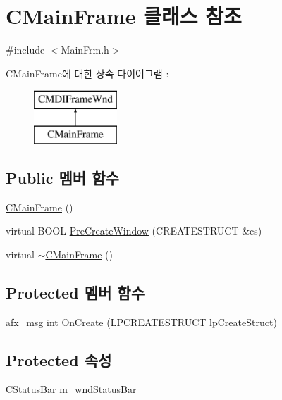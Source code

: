 \hypertarget{class_c_main_frame}{\section{C\-Main\-Frame 클래스 참조}
\label{class_c_main_frame}
}


{\ttfamily \#include $<$Main\-Frm.\-h$>$}

C\-Main\-Frame에 대한 상속 다이어그램 \-: \begin{figure}[H]
\begin{center}
\leavevmode
\includegraphics[height=2.000000cm]{class_c_main_frame}
\end{center}
\end{figure}
\subsection*{Public 멤버 함수}
\begin{DoxyCompactItemize}
\item 
\hyperlink{class_c_main_frame_af3e997aeae4148d2aaa4a1e1ae7bdd53}{C\-Main\-Frame} ()
\item 
virtual B\-O\-O\-L \hyperlink{class_c_main_frame_a549bf677c955c2898c3c683321633c16}{Pre\-Create\-Window} (C\-R\-E\-A\-T\-E\-S\-T\-R\-U\-C\-T \&cs)
\item 
virtual \hyperlink{class_c_main_frame_a8ae555f23fdf97edb4feb4d3e1bfa4ee}{$\sim$\-C\-Main\-Frame} ()
\end{DoxyCompactItemize}
\subsection*{Protected 멤버 함수}
\begin{DoxyCompactItemize}
\item 
afx\-\_\-msg int \hyperlink{class_c_main_frame_a48666466fd37412fcaeff75c3b12e0ed}{On\-Create} (L\-P\-C\-R\-E\-A\-T\-E\-S\-T\-R\-U\-C\-T lp\-Create\-Struct)
\end{DoxyCompactItemize}
\subsection*{Protected 속성}
\begin{DoxyCompactItemize}
\item 
C\-Status\-Bar \hyperlink{class_c_main_frame_ac01bafc03aee69cf982e6f029b4db6b0}{m\-\_\-wnd\-Status\-Bar}
\end{DoxyCompactItemize}


